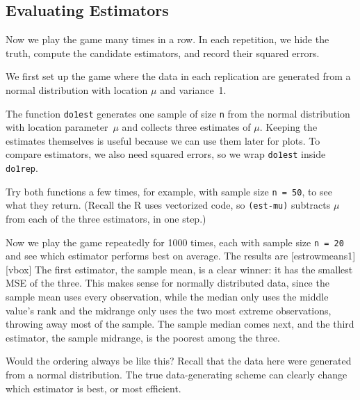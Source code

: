 \subsection{Evaluating Estimators}

Now we play the game many times in a row. In each repetition, we hide
the truth, compute the candidate estimators, and record their squared
errors.

\begin{example}
\label{ex:hs:norm}
We first set up the game where the data in each replication are generated from a
normal distribution with location $\mu$ and variance~1.


The function \lstinline{do1est} generates one sample of size \lstinline{n} from
the normal distribution with location parameter~$\mu$ and collects three
estimates of $\mu$. Keeping the estimates themselves is useful because we can
use them later for plots. To compare estimators, we also need squared
errors, so we wrap \lstinline{do1est} inside \lstinline{do1rep}.


Try both functions a few times, for example, with sample size
\lstinline{n = 50}, to see what they return.
(Recall the R uses vectorized code, so \lstinline{(est-mu)} subtracts
$\mu$ from each of the three estimators, in one step.)

Now we play the game repeatedly for 1000 times, each with sample
size \lstinline{n = 20} and see which estimator performs best on
average.
The results are
[estrowmeans1][vbox]
The first estimator, the sample mean, is a clear winner: it has the
smallest MSE of the three. This makes sense for normally distributed
data, since the sample mean uses every observation, while the median
only uses the middle value's rank and the midrange only uses the two
most extreme observations, throwing away most of the sample. The
sample median comes next, and the third estimator, the sample
midrange, is the poorest among the three.
\end{example}


Would the ordering always be like this? Recall that the data here were
generated from a normal distribution. The true data-generating scheme
can clearly change which estimator is best, or most efficient.


